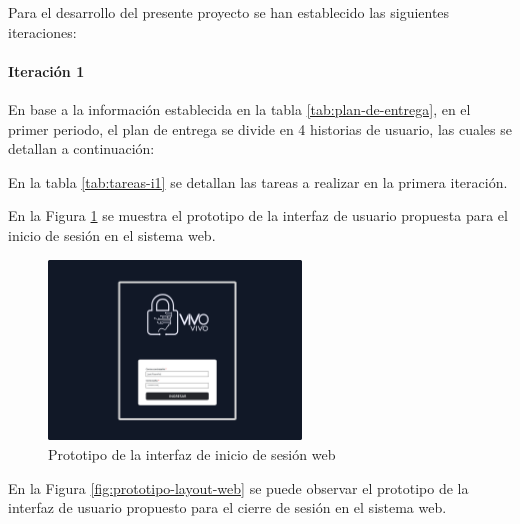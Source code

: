 Para el desarrollo del presente proyecto se han establecido las siguientes iteraciones:

\paragraph{Iteración 1}

En base a la información establecida en la tabla \ref{tab:plan-de-entrega}, en el primer periodo, el plan de
entrega se divide en 4 historias de usuario, las cuales se detallan a continuación:



En la tabla \ref{tab:tareas-i1} se detallan las tareas a realizar en la primera iteración.




En la Figura \ref{fig:prototipo-inicio-sesion-web} se muestra el prototipo de la interfaz de usuario propuesta para
el inicio de sesión en el sistema web.

\begin{figure}[H]
      \centering
      \includegraphics[width=0.6\textwidth]{chapters/III-resultados-y-discusion/resources/images/prototipo-inicio-sesion-web.png}
      \caption{Prototipo de la interfaz de inicio de sesión web}
      \label{fig:prototipo-inicio-sesion-web}
\end{figure}

En la Figura \ref{fig:prototipo-layout-web} se puede observar el prototipo de la interfaz de usuario propuesto para el cierre de sesión
en el sistema web.

